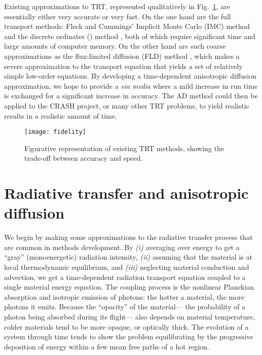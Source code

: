 Existing approximations to TRT, represented qualitatively in
Fig.~\ref{fig:fidelity}, are essentially either very accurate or very fast. On
the one hand are the full transport methods: Fleck and Cummings' Implicit Monte
Carlo (IMC) method \cite{Fle1971} and the discrete ordinates (\SN) method
\cite{Ada1998a}, both of which require significant time and large amounts of
computer memory. On the other hand are such coarse approximations as the
flux-limited diffusion (FLD) method \cite{Ols2000}, which makes a severe
approximation to the transport equation that yields a set of relatively simple
low-order equations. By developing a
time-dependent anisotropic diffusion approximation, we hope to provide a
\emph{via media} where a mild increase in run time is exchanged for a
significant increase in
accuracy. The AD method could then be applied to the CRASH project, or many
other TRT problems, to yield
realistic results in a realistic amount of time.

\begin{figure}[htb]
  \centering
  \texttt{[image: fidelity]}
  \caption{Figurative representation of existing TRT methods, showing the
  trade-off between accuracy and speed.}
  \label{fig:fidelity}
\end{figure}

\section{Radiative transfer and anisotropic diffusion}
We begin by making some approximations to the radiative transfer
process that are common in methods development. By
\textsl{(i)} averaging over energy to get a ``gray'' (monoenergetic) radiation
intensity,
\textsl{(ii)} assuming that the material is at local thermodynamic equilibrium,
and
\textsl{(iii)} neglecting material conduction and advection,
we get a time-dependent radiation transport equation coupled to a single
material energy equation. The coupling process is the nonlinear Planckian
absorption and isotropic emission of photons: the hotter a material, the more
photons it emits.  Because the ``opacity'' of the material---%
the probability of a photon being absorbed during its flight---%
also depends on material temperature, colder materials tend to be more opaque,
or optically thick. The evolution of a system through time tends to show the
problem equilibrating by the progressive deposition of energy within a few mean
free paths of a hot region.

